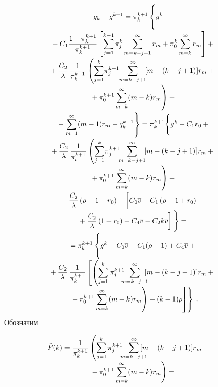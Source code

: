 \begin{multicols}{2}
\noindent
  \begin{multline*}
  g_k-g^{k+1}=\pi_k^{k+1}\left\{ 
  \vphantom{\sum\limits_{j=1}^{k-1}}g^k-{}\right.\\[-2.5pt]
  {}-C_1\fr{1-\pi_k^{k+1}}{\pi_k^{k+1}}\left[ 
  \sum\limits_{j=1}^{k-1}\pi_j^k \sum\limits_{m=k-j+1}^\infty r_m+\pi_0^k 
\sum\limits_{m=k}^\infty r_m\right]+{}\\[-2.5pt]
  {}+
   \fr{C_2}{\lambda}\,\fr{1}{\pi_k^{k+1}}
   \left(\sum\limits_{j=1}^k \!\pi_j^{k+1}\!\sum\limits^\infty_{m=k-j+1}\![m-(k-j+1)]r_m 
+{}\right.\\[-2.5pt]
\left.{}+\pi_0^{k+1}\sum\limits^\infty_{m=k} (m-k)r_m
\vphantom{\sum\limits_{j=1}^k \!\pi_j^{k+1}\!\sum\limits^\infty_{m=k-j+1}}
\right)-{}\\[-2.5pt]
   \left.{}- \sum\limits_{m=1}^\infty (m-1)r_m -q_k^{k+1}
   \vphantom{g^k-C_1\fr{1-\pi_k^{k+1}}{\pi_k^{k+1}}\left[ 
  \sum\limits_{j=1}^{k-1}\pi_j^k \sum\limits_{m=k-j+1}^\infty r_m+\pi_o^k 
\sum\limits_{m=k}^\infty r_m\right]}
\right\} =\pi_k^{k+1}\Bigg\{ \vphantom{\fr{C_2}{\lambda}}
g^k-C_1r_0+{}\\[-2.5pt]
   {}+
  \fr{C_2}{\lambda}\,\fr{1}{\pi_l^{k+1}}\left(
  \sum\limits^k_{j=1} \!\pi_j^{k+1} \!\!
\sum\limits^\infty_{m=k-j+1}\![m-(k-j+1)]r_m +{}\right.\\[-2.5pt]
\left.{}+\pi_0^{k+1}\sum\limits^\infty_{m=k} (m-k)r_m
\vphantom{\sum\limits^k_{j=1} \!\pi_j^{k+1} \!\!
\sum\limits^\infty_{m=k-j+1}}\right) -{}\\[-2.5pt]
  {}-
  \fr{C_2}{\lambda}\left(\rho-1+r_0\right) -\left[
  \vphantom{\fr{C_1}{\lambda}} 
  C_0\overline{v} - C_1\left(\rho -
1+r_0\right) +{}\right.\\[-2.5pt]
\left.{}+\fr{C_2}{\lambda} \left(1-r_0\right) -C_4\overline{v}-C_2 k 
\overline{v}\right]
\Bigg\}={}\\[-2.5pt]
  {}=
   \pi_k^{k+1} \left\{ 
\vphantom{\sum\limits^k_{j=1}\pi_j^{k+1}}
 g^k -C_0\overline{v} +C_1(\rho-1) +C_4\overline{v}+{}\right.\\[-2.5pt]
   {}+\fr{C_2}{\lambda}\,\fr{1}{\pi_k^{k+1}}
\left[\left( \sum\limits^k_{j=1}\pi_j^{k+1} \!\!\!\!
\sum\limits^\infty_{m=k-j+1}  \!\!\!
[m-(k-j+1)]r_m +{}\right.\right.\\[-2.5pt]
\left.\left.\left.{}+\pi_0^{k+1} \sum\limits^\infty_{m=k} (m-k)r_m
\vphantom{\sum\limits^k_{j=1}\pi_j^{k+1}}\right)+
 (k-1)\rho\right]\right\}\,.
   \end{multline*}
  Обозначим 
  
  \noindent
  \begin{multline*}
 \hspace*{-7pt}\!\! \tilde{F}(k) =\fr{1}{\pi_k^{k+1}}\left(\sum\limits^k_{j=1\!} \pi_j^{k+1}
  \!\!\! \sum\limits^\infty_{m=k-
j+1}\!\! \!\!\!\![m-(k-j+1)]r_m+{}\right.\\[-3pt]
\left.{}+\pi_0^{k+1}\sum\limits^\infty_{m=k}(m-
k)r_m\right) = {}
\end{multline*}


\end{multicols}
